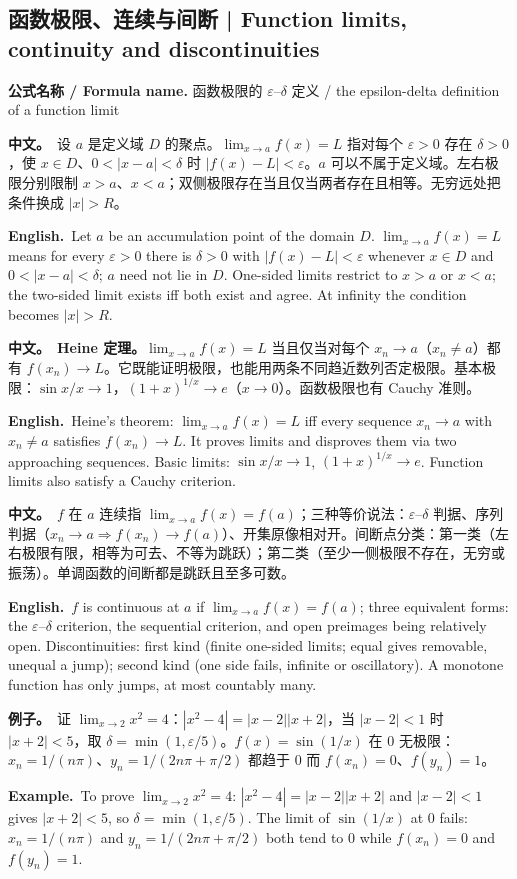 \documentclass[UTF8,11pt,a4paper]{ctexart}
\newcommand{\BOTH}[2]{\par\noindent\textbf{中文。}\ #1\par\noindent\textbf{English.}\ #2\par}
\newcommand{\EX}[2]{\par\noindent\textbf{例子。}\ #1\par\noindent\textbf{Example.}\ #2\par}
\newcommand{\FORMULA}[2]{\par\noindent\textbf{公式名称 / Formula name.} #1 / #2\par}
\begin{document}
\subsection{函数极限、连续与间断 | Function limits, continuity and discontinuities}
\FORMULA{函数极限的 $\varepsilon$--$\delta$ 定义}{the epsilon-delta definition of a function limit}
\BOTH{设 $a$ 是定义域 $D$ 的聚点。$\lim_{x\to a}f(x)=L$ 指对每个 $\varepsilon>0$ 存在 $\delta>0$，使 $x\in D$、$0<|x-a|<\delta$ 时 $|f(x)-L|<\varepsilon$。$a$ 可以不属于定义域。左右极限分别限制 $x>a$、$x<a$；双侧极限存在当且仅当两者存在且相等。无穷远处把条件换成 $|x|>R$。}{Let $a$ be an accumulation point of the domain $D$. $\lim_{x\to a}f(x)=L$ means for every $\varepsilon>0$ there is $\delta>0$ with $|f(x)-L|<\varepsilon$ whenever $x\in D$ and $0<|x-a|<\delta$; $a$ need not lie in $D$. One-sided limits restrict to $x>a$ or $x<a$; the two-sided limit exists iff both exist and agree. At infinity the condition becomes $|x|>R$.}
\BOTH{\textbf{Heine 定理。}$\lim_{x\to a}f(x)=L$ 当且仅当对每个 $x_n\to a$（$x_n\ne a$）都有 $f(x_n)\to L$。它既能证明极限，也能用两条不同趋近数列否定极限。基本极限：$\sin x/x\to1$，$(1+x)^{1/x}\to e$（$x\to0$）。函数极限也有 Cauchy 准则。}{Heine's theorem: $\lim_{x\to a}f(x)=L$ iff every sequence $x_n\to a$ with $x_n\ne a$ satisfies $f(x_n)\to L$. It proves limits and disproves them via two approaching sequences. Basic limits: $\sin x/x\to1$, $(1+x)^{1/x}\to e$. Function limits also satisfy a Cauchy criterion.}
\BOTH{$f$ 在 $a$ 连续指 $\lim_{x\to a}f(x)=f(a)$；三种等价说法：$\varepsilon$--$\delta$ 判据、序列判据（$x_n\to a\Rightarrow f(x_n)\to f(a)$）、开集原像相对开。间断点分类：第一类（左右极限有限，相等为可去、不等为跳跃）；第二类（至少一侧极限不存在，无穷或振荡）。单调函数的间断都是跳跃且至多可数。}{$f$ is continuous at $a$ if $\lim_{x\to a}f(x)=f(a)$; three equivalent forms: the $\varepsilon$--$\delta$ criterion, the sequential criterion, and open preimages being relatively open. Discontinuities: first kind (finite one-sided limits; equal gives removable, unequal a jump); second kind (one side fails, infinite or oscillatory). A monotone function has only jumps, at most countably many.}
\EX{证 $\lim_{x\to2}x^2=4$：$|x^2-4|=|x-2||x+2|$，当 $|x-2|<1$ 时 $|x+2|<5$，取 $\delta=\min(1,\varepsilon/5)$。$f(x)=\sin(1/x)$ 在 $0$ 无极限：$x_n=1/(n\pi)$、$y_n=1/(2n\pi+\pi/2)$ 都趋于 $0$ 而 $f(x_n)=0$、$f(y_n)=1$。}{To prove $\lim_{x\to2}x^2=4$: $|x^2-4|=|x-2||x+2|$ and $|x-2|<1$ gives $|x+2|<5$, so $\delta=\min(1,\varepsilon/5)$. The limit of $\sin(1/x)$ at $0$ fails: $x_n=1/(n\pi)$ and $y_n=1/(2n\pi+\pi/2)$ both tend to $0$ while $f(x_n)=0$ and $f(y_n)=1$.}
\end{document}
